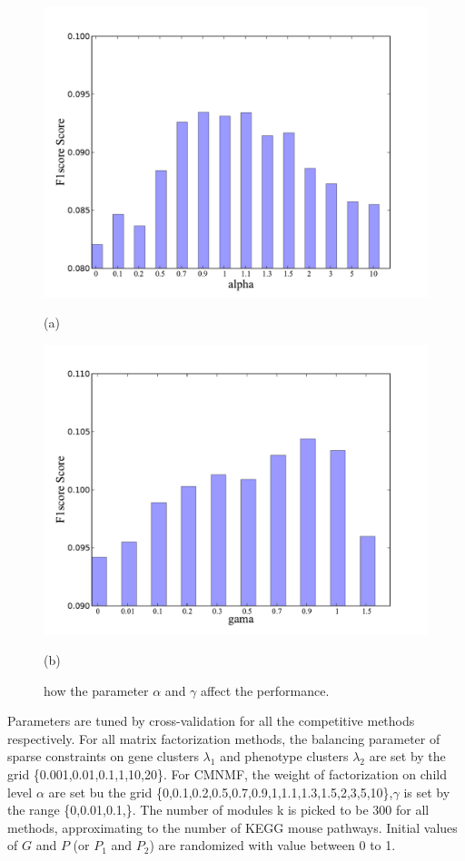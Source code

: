 \documentclass{bmcart}
\begin{document}
\begin{figure}[!h]
  \centering
  \begin{minipage}{.4\linewidth}
  \centering
    \includegraphics[width=\linewidth]{DrawPictures/alpha.pdf}
    \centerline{(a)}
  \end{minipage}
  \begin{minipage}{.4\linewidth}
   \includegraphics[width=\linewidth]{DrawPictures/gama.pdf}
    \centerline{(b)}
  \end{minipage}
  \caption{how the parameter $\alpha$ and $\gamma$ affect the performance.}
  \label{fig:alpha_gamma}
\end{figure}

Parameters are tuned by cross-validation for all the competitive methods respectively. For all matrix factorization methods, the balancing parameter of sparse constraints on gene clusters $\lambda_1$ and phenotype clusters $\lambda_2$ are set by the grid \{0.001,0.01,0.1,1,10,20\}. For CMNMF, the weight of factorization on child level $\alpha$ are set bu the grid \{0,0.1,0.2,0.5,0.7,0.9,1,1.1,1.3,1.5,2,3,5,10\},$\gamma$ is set by the range \{0,0.01,0.1,\}. The number of modules k is picked to be 300 for all methods, approximating to the number of KEGG mouse pathways. Initial values of $G$ and $P$ (or $P_1$ and $P_2$) are randomized with value between 0 to 1.
\end{document}
